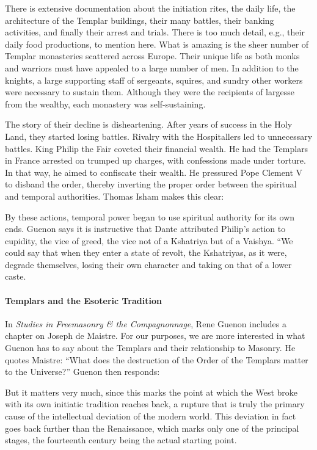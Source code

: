 There is extensive documentation about the initiation rites, the daily life, the architecture of the Templar buildings, their many battles, their banking activities, and finally their arrest and trials. There is too much detail, e.g., their daily food productions, to mention here. What is amazing is the sheer number of Templar monasteries scattered across Europe. Their unique life as both monks and warriors must have appealed to a large number of men. In addition to the knights, a large supporting staff of sergeants, squires, and sundry other workers were necessary to sustain them. Although they were the recipients of largesse from the wealthy, each monastery was self-sustaining.

The story of their decline is disheartening. After years of success in the Holy Land, they started losing battles. Rivalry with the Hospitallers led to unnecessary battles. King Philip the Fair coveted their financial wealth. He had the Templars in France arrested on trumped up charges, with confessions made under torture. In that way, he aimed to confiscate their wealth. He pressured Pope Clement V to disband the order, thereby inverting the proper order between the spiritual and temporal authorities. Thomas Isham makes this clear:

\begin{quotex}
By these actions, temporal power began to use spiritual authority for its own ends. Guenon says it is instructive that Dante attributed Philip's action to cupidity, the vice of greed, the vice not of a Kshatriya but of a Vaishya. ``We could say that when they enter a state of revolt, the Kshatriyas, as it were, degrade themselves, losing their own character and taking on that of a lower caste.
\end{quotex}


\paragraph{Templars and the Esoteric Tradition}


In \emph{Studies in Freemasonry \& the Compagnonnage}, Rene Guenon includes a chapter on Joseph de Maistre. For our purposes, we are more interested in what Guenon has to say about the Templars and their relationship to Masonry. He quotes Maistre: ``What does the destruction of the Order of the Templars matter to the Universe?'' Guenon then responds:

\begin{quotex}
But it matters very much, since this marks the point at which the West broke with its own initiatic tradition reaches back, a rupture that is truly the primary cause of the intellectual deviation of the modern world. This deviation in fact goes back further than the Renaissance, which marks only one of the principal stages, the fourteenth century being the actual starting point.
\end{quotex}


